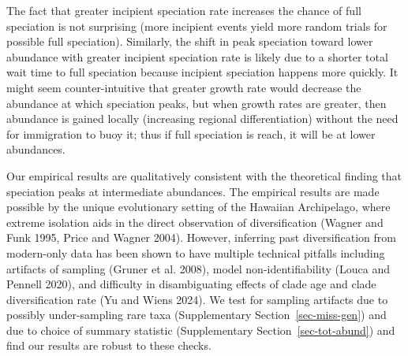 \documentclass[
  letterpaper,
  DIV=11,
  numbers=noendperiod]{scrartcl}
\newcommand{\ssec}[1]{Supplementary Section~\ref{#1}}
\begin{document}
The fact that greater incipient speciation rate increases the chance of
full speciation is not surprising (more incipient events yield more
random trials for possible full speciation). Similarly, the shift in
peak speciation toward lower abundance with greater incipient speciation
rate is likely due to a shorter total wait time to full speciation
because incipient speciation happens more quickly. It might seem
counter-intuitive that greater growth rate would decrease the abundance
at which speciation peaks, but when growth rates are greater, then
abundance is gained locally (increasing regional differentiation)
without the need for immigration to buoy it; thus if full speciation is
reach, it will be at lower abundances.

Our empirical results are qualitatively consistent with the theoretical
finding that speciation peaks at intermediate abundances. The empirical
results are made possible by the unique evolutionary setting of the
Hawaiian Archipelago, where extreme isolation aids in the direct
observation of diversification (Wagner and Funk 1995, Price and Wagner
2004). However, inferring past diversification from modern-only data has
been shown to have multiple technical pitfalls including artifacts of
sampling (Gruner et al. 2008), model non-identifiability (Louca and
Pennell 2020), and difficulty in disambiguating effects of clade age and
clade diversification rate (Yu and Wiens 2024). We test for sampling
artifacts due to possibly under-sampling rare taxa (\ssec{sec-miss-gen})
and due to choice of summary statistic (\ssec{sec-tot-abund}) and find
our results are robust to these checks.
\end{document}
